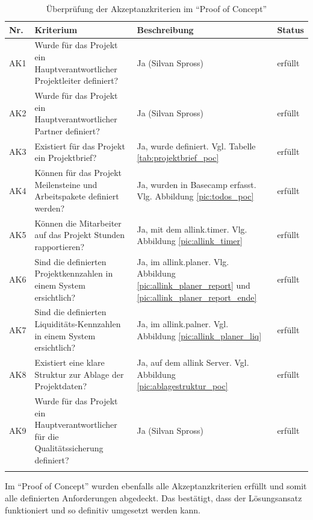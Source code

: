 \begin{longtable}{lp{6cm}p{5cm}l}
    \toprule \textbf{Nr.} & \textbf{Kriterium} & \textbf{Beschreibung} & \textbf{Status} \\
    \midrule AK1 &
        Wurde für das Projekt ein Hauptverantwortlicher Projektleiter definiert? &
        Ja (Silvan Spross) &
        erfüllt \\
    \midrule AK2 &
        Wurde für das Projekt ein Hauptverantwortlicher Partner definiert? &
        Ja (Silvan Spross) &
        erfüllt \\
    \midrule AK3 &
        Existiert für das Projekt ein Projektbrief? &
        Ja, wurde definiert. Vgl. Tabelle \ref{tab:projektbrief_poc} &
        erfüllt \\
    \midrule AK4 &
        Können für das Projekt Meilensteine und Arbeitspakete definiert werden? &
        Ja, wurden in Basecamp erfasst. Vlg. Abbildung \ref{pic:todos_poc} &
        erfüllt \\
    \midrule AK5 &
        Können die Mitarbeiter auf das Projekt Stunden rapportieren? &
        Ja, mit dem allink.timer. Vlg. Abbildung \ref{pic:allink_timer} &
        erfüllt \\
    \midrule AK6 &
        Sind die definierten Projektkennzahlen in einem System ersichtlich? &
        Ja, im allink.planer. Vlg. Abbildung \ref{pic:allink_planer_report}
        und \ref{pic:allink_planer_report_ende} &
        erfüllt \\
    \midrule AK7 &
        Sind die definierten Liquiditäts-Kennzahlen in einem System ersichtlich? &
        Ja, im allink.palner. Vgl. Abbildung \ref{pic:allink_planer_liq} &
        erfüllt \\
    \midrule AK8 &
        Existiert eine klare Struktur zur Ablage der Projektdaten? &
        Ja, auf dem allink Server. Vgl. Abbildung \ref{pic:ablagestruktur_poc} &
        erfüllt \\
    \midrule AK9 &
        Wurde für das Projekt ein Hauptverantwortlicher für die Qualitätssicherung definiert? &
        Ja (Silvan Spross) &
        erfüllt \\
    \bottomrule
    \caption[Überprüfung der Akzeptanzkriterien im ``Proof of Concept'']{Überprüfung 
        der Akzeptanzkriterien im ``Proof of Concept''\footnotemark}
    \label{tab:akzeptanzkriterien_test_poc}
\end{longtable}

Im ``Proof of Concept'' wurden ebenfalls alle Akzeptanzkriterien erfüllt
und somit alle definierten Anforderungen abgedeckt. Das bestätigt, dass der
Lösungsansatz funktioniert und so definitiv umgesetzt werden kann.
